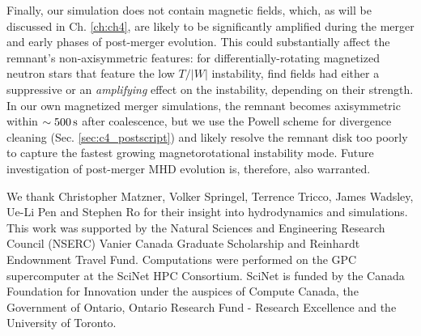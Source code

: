 
Finally, our simulation does not contain magnetic fields, which, as will be discussed in Ch. \ref{ch:ch4}, are likely to be significantly amplified during the merger and early phases of post-merger evolution.  This could substantially affect the remnant's non-axisymmetric features: for differentially-rotating magnetized neutron stars that feature the low $T/|W|$ instability, \cite{muhl+14} find fields had either a suppressive or an \textit{amplifying} effect on the instability, depending on their strength.  In our own magnetized merger simulations, the remnant becomes axisymmetric within $\sim500\,\mathrm{s}$ after coalescence, but we use the Powell scheme for divergence cleaning (Sec. \ref{sec:c4_postscript}) and likely resolve the remnant disk too poorly to capture the fastest growing magnetorotational instability mode.  Future investigation of post-merger MHD evolution is, therefore, also warranted.

\vspace{10mm}

We thank Christopher Matzner, Volker Springel, Terrence Tricco, James Wadsley, Ue-Li Pen and Stephen Ro for their insight into hydrodynamics and simulations.  This work was supported by the Natural Sciences and Engineering Research Council (NSERC) Vanier Canada Graduate Scholarship and Reinhardt Endownment Travel Fund.  Computations were performed on the GPC supercomputer at the SciNet HPC Consortium.  SciNet \citep{loke+10} is funded by the Canada Foundation for Innovation under the auspices of Compute Canada, the Government of Ontario, Ontario Research Fund - Research Excellence and the University of Toronto.


